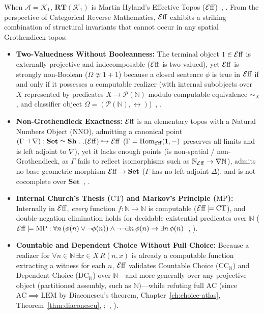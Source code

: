 When $\mathcal{A} = \mathcal{K}_1$, $\mathbf{RT}(\mathcal{K}_1)$ is Martin Hyland's Effective Topos ($\mathcal{E}\mathrm{ff}$)~\cite[pp.~165--216]{Hyland82}, \cite[Chs.~2--3]{vanOosten08}. From the perspective of Categorical Reverse Mathematics, $\mathcal{E}\mathrm{ff}$ exhibits a striking combination of structural invariants that cannot occur in any spatial Grothendieck topos:

\begin{itemize}

  \item \textbf{Two-Valuedness Without Booleanness:} The terminal object $1 \in \mathcal{E}\mathrm{ff}$ is externally projective and indecomposable ($\mathcal{E}\mathrm{ff}$ is two-valued), yet $\mathcal{E}\mathrm{ff}$ is strongly non-Boolean ($\Omega \not\simeq 1+1$) because a closed sentence $\phi$ is true in $\mathcal{E}\mathrm{ff}$ if and only if it possesses a computable realizer (with internal subobjects over $X$ represented by predicates $X \to \mathcal{P}(\mathbb{N})$ modulo computable equivalence $\sim_X$, and classifier object $\Omega = (\mathcal{P}(\mathbb{N}), {\leftrightarrow})$)~\cite{Hyland82}, \cite[\S 3.1]{vanOosten08}.

  \item \textbf{Non-Grothendieck Exactness:} $\mathcal{E}\mathrm{ff}$ is an elementary topos with a Natural Numbers Object ($\mathrm{NNO}$), admitting a canonical point $(\Gamma \dashv \nabla) : \mathbf{Set} \simeq \mathbf{Sh}_{\neg\neg}(\mathcal{E}\mathrm{ff}) \hookrightarrow \mathcal{E}\mathrm{ff}$ ($\Gamma = \mathrm{Hom}_{\mathcal{E}\mathrm{ff}}(1, -)$ preserves all limits and is left adjoint to $\nabla$), yet it lacks enough points (is non-spatial / non-Grothendieck, as $\Gamma$ fails to reflect isomorphisms such as $\mathbb{N}_{\mathcal{E}\mathrm{ff}} \to \nabla\mathbb{N}$), admits no base geometric morphism $\mathcal{E}\mathrm{ff} \to \mathbf{Set}$ ($\Gamma$ has no left adjoint $\Delta$), and is not cocomplete over $\mathbf{Set}$~\cite{Hyland82}, \cite[\S\S 3.1--3.2]{vanOosten08}.

  \item \textbf{Internal Church's Thesis ($\mathrm{CT}$) and Markov's Principle ($\mathrm{MP}$):} Internally in $\mathcal{E}\mathrm{ff}$, \emph{every} function $f: \mathbb{N} \to \mathbb{N}$ is computable ($\mathcal{E}\mathrm{ff} \models \mathrm{CT}$), and double-negation elimination holds for decidable existential predicates over $\mathbb{N}$ ($\mathcal{E}\mathrm{ff} \models \mathrm{MP}: \forall n\,(\phi(n) \vee \neg\phi(n)) \wedge \neg\neg\exists n\,\phi(n) \to \exists n\,\phi(n)$~\cite{Hyland82}, \cite[\S 3.2]{vanOosten08}).

  \item \textbf{Countable and Dependent Choice Without Full Choice:} Because a realizer for $\forall n \in \mathbb{N}\,\exists x \in X\, R(n, x)$ is already a computable function extracting a witness for each $n$, $\mathcal{E}\mathrm{ff}$ validates Countable Choice ($\mathrm{CC}_{\mathbb{N}}$) and Dependent Choice ($\mathrm{DC}_{\mathbb{N}}$) over $\mathbb{N}$---and more generally over any projective object (partitioned assembly, such as $\mathbb{N}$)---while refuting full $\mathrm{AC}$ (since $\mathrm{AC} \implies \mathrm{LEM}$ by Diaconescu's theorem, Chapter~\ref{ch:choice-atlas}, Theorem~\ref{thm:diaconescu}, \cite{Diaconescu75};~\cite{Hyland82}, \cite[\S 3.2]{vanOosten08}).

\end{itemize}


